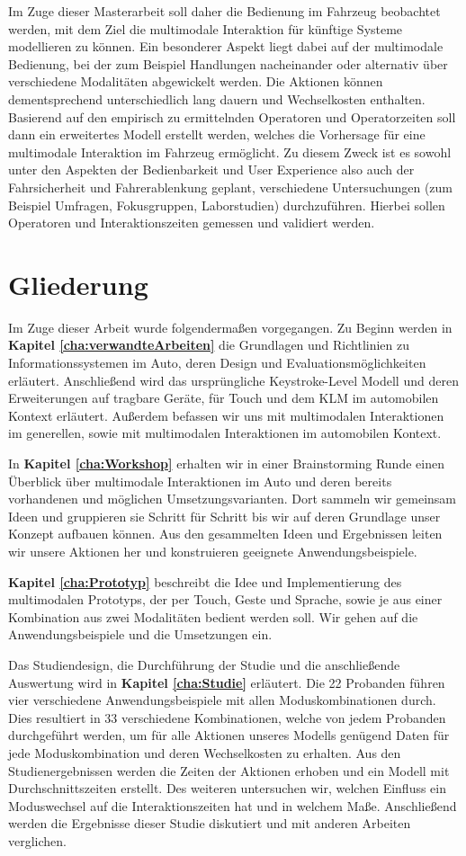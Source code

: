 Im Zuge dieser Masterarbeit soll daher die Bedienung im Fahrzeug beobachtet werden, mit dem Ziel die multimodale Interaktion für künftige Systeme modellieren zu können.
Ein besonderer Aspekt liegt dabei auf der multimodale Bedienung, bei der zum Beispiel Handlungen nacheinander oder alternativ über verschiedene Modalitäten abgewickelt werden.
Die Aktionen können dementsprechend unterschiedlich lang dauern und Wechselkosten enthalten.
Basierend auf den empirisch zu ermittelnden Operatoren und Operatorzeiten soll dann ein erweitertes Modell erstellt werden, welches die Vorhersage für eine multimodale Interaktion im Fahrzeug ermöglicht.
Zu diesem Zweck ist es sowohl unter den Aspekten der Bedienbarkeit und User Experience also auch der Fahrsicherheit und Fahrerablenkung geplant, verschiedene Untersuchungen (zum Beispiel Umfragen, Fokusgruppen, Laborstudien) durchzuführen.
Hierbei sollen Operatoren und Interaktionszeiten gemessen und validiert werden. 

\section*{Gliederung}
Im Zuge dieser Arbeit wurde folgendermaßen vorgegangen.
Zu Beginn werden in \textbf{Kapitel \ref{cha:verwandteArbeiten}} die Grundlagen und Richtlinien zu Informationssystemen im Auto, deren Design und Evaluationsmöglichkeiten erläutert.
Anschließend wird das ursprüngliche Keystroke-Level Modell und deren Erweiterungen auf tragbare Geräte, für Touch und dem KLM im automobilen Kontext erläutert.
Außerdem befassen wir uns mit multimodalen Interaktionen im generellen, sowie mit multimodalen Interaktionen im automobilen Kontext. 

In \textbf{Kapitel \ref{cha:Workshop}} erhalten wir in einer Brainstorming Runde einen Überblick über multimodale Interaktionen im Auto und deren bereits vorhandenen und möglichen Umsetzungsvarianten.
Dort sammeln wir gemeinsam Ideen und gruppieren sie Schritt für Schritt bis wir auf deren Grundlage unser Konzept aufbauen können.
Aus den gesammelten Ideen und Ergebnissen leiten wir unsere Aktionen her und konstruieren geeignete Anwendungsbeispiele. 

\textbf{Kapitel \ref{cha:Prototyp}} beschreibt die Idee und Implementierung des multimodalen Prototyps, der per Touch, Geste und Sprache, sowie je aus einer Kombination aus zwei Modalitäten bedient werden soll. 
Wir gehen auf die Anwendungsbeispiele und die Umsetzungen ein. 

Das Studiendesign, die Durchführung der Studie und die anschließende Auswertung wird in \textbf{Kapitel \ref{cha:Studie}} erläutert.
Die 22 Probanden führen vier verschiedene Anwendungsbeispiele mit allen Moduskombinationen durch.
Dies resultiert in 33 verschiedene Kombinationen, welche von jedem Probanden durchgeführt werden, um für alle Aktionen unseres Modells genügend Daten für jede Moduskombination und deren Wechselkosten zu erhalten.
Aus den Studienergebnissen werden die Zeiten der Aktionen erhoben und ein Modell mit Durchschnittszeiten erstellt.
Des weiteren untersuchen wir, welchen Einfluss ein Moduswechsel auf die Interaktionszeiten hat und in welchem Maße.
Anschließend werden die Ergebnisse dieser Studie diskutiert und mit anderen Arbeiten verglichen.

